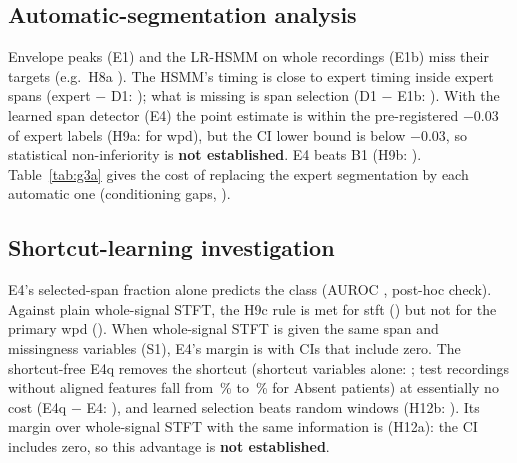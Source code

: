 \documentclass[11pt,a4paper]{article}
\begin{document}
\subsection{Automatic-segmentation analysis}
Envelope peaks (E1) and the LR-HSMM on whole recordings (E1b) miss their targets (e.g.\ H8a ). The HSMM's
timing is close to expert timing inside expert spans (expert $-$ D1: ); what is missing is
span selection (D1 $-$ E1b: ). With the learned span detector (E4) the point estimate is within
the pre-registered $-0.03$ of expert labels (H9a:  for wpd), but the CI lower bound is below $-0.03$, so
statistical non-inferiority is \textbf{not established}. E4 beats B1 (H9b: ). Table~\ref{tab:g3a} gives the
cost of replacing the expert segmentation by each automatic one (conditioning gaps, \cite{cao2026}).
\begin{table}[H]\centering\caption{Conditioning gaps: AUROC(expert) minus AUROC(estimated or random) (RF, 95\,\% CI).}\label{tab:g3a}
\resizebox{0.85\textwidth}{!}{}\end{table}

\subsection{Shortcut-learning investigation}
E4's selected-span fraction alone predicts the class (AUROC , post-hoc check). Against plain
whole-signal STFT, the H9c rule is met for stft () but not for the primary wpd (). When
whole-signal STFT is given the same span and missingness variables (S1), E4's margin is  with CIs that
include zero. The shortcut-free E4q removes the shortcut (shortcut variables alone: ; test
recordings without aligned features fall from \,\% to \,\% for Absent
patients) at essentially no cost (E4q $-$ E4: ), and learned selection beats random windows
(H12b: ). Its margin over whole-signal STFT with the same information is 
(H12a): the CI includes zero, so this advantage is \textbf{not established}.
\end{document}
